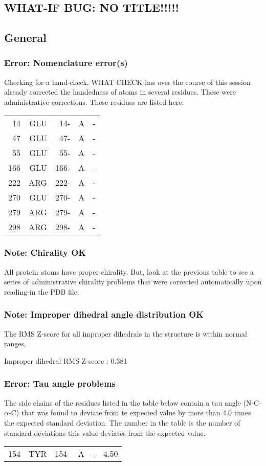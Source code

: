 \documentclass[a4paper]{article}
\def\showsect#1{
  \thesect\gdef\thesect{}
  \thessect\gdef\thessect{}
  \subsubsection{#1}
}
\gdef\thesect{\pagebreak[2]\section{WHAT-IF BUG: NO TITLE!!!!!}}
\gdef\thessect{\subsection{General}}
\begin{document}
\begin{error}
\showsect{Error: Nomenclature error(s)}
Checking for a hand-check. WHAT CHECK has over the course of this session
already corrected the handedness of atoms in several residues. These were
administrative corrections. These residues are listed here.
 
\begin{center}
 
\begin{supertabular}{rr@{ (}r@{) }rl}
   14&GLU &  14-&A &-\\
   47&GLU &  47-&A &-\\
   55&GLU &  55-&A &-\\
  166&GLU & 166-&A &-\\
  222&ARG & 222-&A &-\\
  270&GLU & 270-&A &-\\
  279&ARG & 279-&A &-\\
  298&ARG & 298-&A &-\\
\end{supertabular}\end{center}
\end{error}

\begin{note}
\showsect{Note: Chirality OK}
All protein atoms have proper chirality. But, look at the previous table to
see a series of administrative chirality problems that were corrected
automatically upon reading-in the PDB file.
\end{note}

\begin{note}
\showsect{Note: Improper dihedral angle distribution OK}
The RMS Z-score for all improper dihedrals in the structure is within normal
ranges.
 
\parbox{1\textwidth}{
 Improper dihedral RMS Z-score : 0.381
}%
 
\end{note}

\begin{error}
\showsect{Error: Tau angle problems}
The side chains of the residues listed in the table below contain a tau
angle (N-C-$\alpha$-C) that was found to deviate from te expected value by
more than 4.0 times the expected standard deviation. The number in the
table is the number of standard deviations this value deviates from
the expected value.
 
\begin{center}
 
\begin{supertabular}{rr@{ (}r@{) }rl@{ }r}
  154&TYR & 154-&A &-&  4.50\\
\end{supertabular}\end{center}
\end{error}
\end{document}
